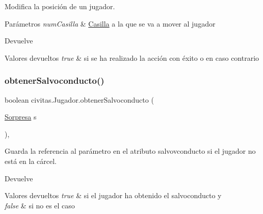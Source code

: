 Modifica la posición de un jugador. 
\begin{DoxyParams}{Parámetros}
{\em num\+Casilla} & \hyperlink{classcivitas_1_1Casilla}{Casilla} a la que se va a mover al jugador \\
\hline
\end{DoxyParams}
\begin{DoxyReturn}{Devuelve}

\end{DoxyReturn}

\begin{DoxyRetVals}{Valores devueltos}
{\em true} & si se ha realizado la acción con éxito o  en caso contrario \\
\hline
\end{DoxyRetVals}
\mbox{\label{classcivitas_1_1Jugador_a0e052cf2f305003ab8a2084b643ff9bb}} 
\subsubsection{\texorpdfstring{obtener\+Salvoconducto()}{obtenerSalvoconducto()}}
{\footnotesize\ttfamily boolean civitas.\+Jugador.\+obtener\+Salvoconducto (\begin{DoxyParamCaption}\item[{\hyperlink{classcivitas_1_1Sorpresa}{Sorpresa}}]{s }\end{DoxyParamCaption})\hspace{0.3cm}{\ttfamily [inline]}, {\ttfamily [package]}}

Guarda la referencia al parámetro en el atributo salvovconducto si el jugador no está en la cárcel. \begin{DoxyReturn}{Devuelve}

\end{DoxyReturn}

\begin{DoxyRetVals}{Valores devueltos}
{\em true} & si el jugador ha obtenido el salvoconducto y \\
\hline
{\em false} & si no es el caso \\
\hline
\end{DoxyRetVals}
\mbox{\label{classcivitas_1_1Jugador_a5a7a0ba48bd151a808fa2f3edeecf75f}} 
